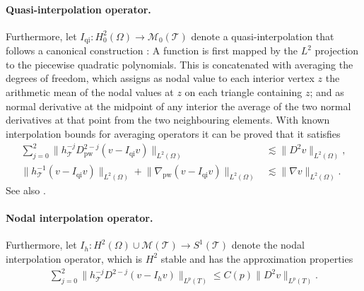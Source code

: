 \documentclass[a4paper]{amsart}
\theoremstyle{definition}
\numberwithin{equation}{section}
\numberwithin{theorem}{section}
\newcommand{\pw}{\mathrm{pw}}
\newcommand{\tri}{\mathcal{T}}
\begin{document}
\paragraph{Quasi-interpolation operator.}
Furthermore, let $I_\mathrm{qi}:H^2_0(\Omega)\to \mathcal{M}_0(\tri)$
denote a quasi-interpolation that follows a canonical construction
\cite{Oswald1994}:
A function is first mapped by the  $L^2$ projection 
to the piecewise quadratic polynomials. This is concatenated
with averaging the degrees of freedom, which
assigns as nodal value to each interior vertex $z$ the arithmetic
mean of the nodal values at $z$ on each triangle containing
$z$; and as normal derivative at the midpoint of any interior 
the average
of the two normal derivatives at that point from the two
neighbouring elements.
With known interpolation bounds for
averaging operators \cite{Oswald1994,DiPietroErn2012}
it can be proved that it satisfies
\begin{equation}\label{e:quasi_interpolation}
\begin{aligned}
    \sum_{j=0}^2 
    \lVert h_\tri^{-j}D_\pw^{2-j} (v-I_\mathrm{qi} v)\rVert_{L^2(\Omega)}
    &\lesssim \lVert D^2 v\rVert_{L^2(\Omega)},\\
    \lVert h_\tri^{-1}(v-I_\mathrm{qi} v)\rVert_{L^2(\Omega)}
    +\lVert \nabla_\pw (v-I_\mathrm{qi} v)\rVert_{L^2(\Omega)}
    &\lesssim \lVert \nabla v\rVert_{L^2(\Omega)}.
\end{aligned}
\end{equation}
See also \cite[Chapter~10.6]{BrennerScott2008}.

\paragraph{Nodal interpolation operator.}
Furthermore, let $I_h:H^2(\Omega)\cup \mathcal{M}(\tri)\to S^1(\tri)$ 
denote the nodal interpolation 
operator, which is $H^2$ stable and has the
approximation properties \cite{BrennerScott2008}
\begin{align}\label{e:nodal_interpolation_approx}
    \sum_{j=0}^2 \lVert h_\tri^{-j}D^{2-j}(v-I_h v)\rVert_{L^p(T)} 
    \leq C(p) \lVert D^2 v\rVert_{L^p(T)}.
\end{align}
\end{document}
